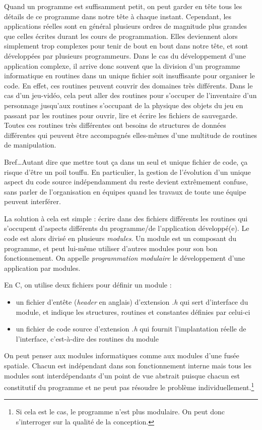 \documentclass[../../../main.tex]{subfiles}
\begin{document}
Quand un programme est suffisamment petit, on peut garder en tête tous les détails de ce programme dans notre tête à chaque instant. Cependant, les applications réelles sont en général plusieurs ordres de magnitude plus grandes que celles écrites durant les cours de programmation. Elles deviennent alors simplement trop complexes pour tenir de bout en bout dans notre tête, et sont développées par plusieurs programmeurs. Dans le cas du développement d'une application complexe, il arrive donc souvent que la division d'un programme informatique en routines dans un unique fichier soit insuffisante pour organiser le code. En effet, ces routines peuvent couvrir des domaines très différents. Dans le cas d'un jeu-vidéo, cela peut aller des routines pour s'occuper de l'inventaire d'un personnage jusqu'aux routines s'occupant de la physique des objets du jeu en passant par les routines pour ouvrir, lire et écrire les fichiers de sauvegarde. Toutes ces routines très différentes ont besoins de structures de données différentes qui peuvent être accompagnés elles-mêmes d'une multitude de routines de manipulation.

Bref\dots Autant dire que mettre tout ça dans un seul et unique fichier de code, ça risque d'être un poil touffu. En particulier, la gestion de l'évolution d'un unique aspect du code source indépendamment du reste devient extrêmement confuse, sans parler de l'organisation en équipes quand les travaux de toute une équipe peuvent interférer. 
 
La solution à cela est simple : écrire dans des fichiers différents les routines qui s'occupent d'aspects différents du programme/de l'application développé(e). Le code est alors divisé en plusieurs \textit{modules}. Un module est un composant du programme, et peut lui-même utiliser d'autres modules pour son bon fonctionnement. On appelle \textit{programmation modulaire} le développement d'une application par modules.

En C, on utilise deux fichiers pour définir un module :
\begin{itemize}
	\item un fichier d'entête (\textit{header} en anglais) d'extension \textit{.h} qui sert d'interface du module, et indique les structures, routines et constantes définies par celui-ci
	\item un fichier de code source d'extension \textit{.h} qui fournit l'implantation réelle de l'interface, c'est-à-dire des routines du module
\end{itemize}
On peut penser aux modules informatiques comme aux modules d'une fusée spatiale. Chacun est indépendant dans son fonctionnement interne mais tous les modules sont interdépendants d'un point de vue abstrait puisque chacun est constitutif du programme et ne peut pas résoudre le problème individuellement.\footnote{Si cela est le cas, le programme n'est plus modulaire. On peut donc s'interroger sur la qualité de la conception.}
 
\end{document}
